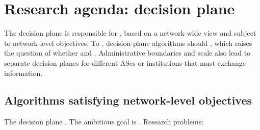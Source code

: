 \section{Research agenda: decision plane}
The decision plane is responsible for , based on a network-wide view and subject to network-level objectives. To , decision-plane algorithms should , which raises the question of whether and . Administrative boundaries and scale also lead to separate decision planes for different ASes or institutions that must exchange information.

\subsection{Algorithms satisfying network-level objectives}
The decision plane . The ambitious goal is . Research problems:

